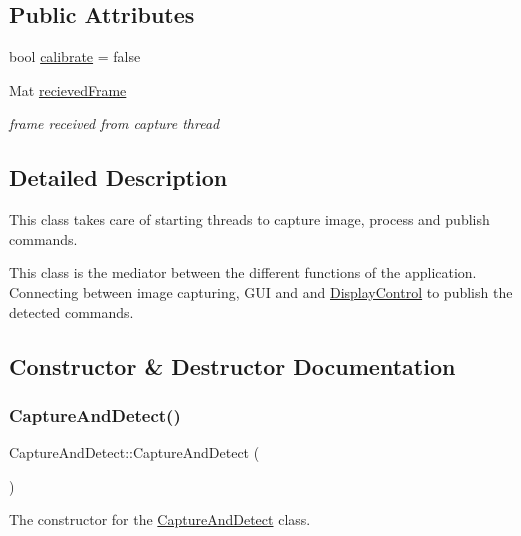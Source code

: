 \subsection*{Public Attributes}
\begin{DoxyCompactItemize}
\item 
bool \hyperlink{classGestro_1_1CaptureAndDetect_acbe1ce90cb6a7bad1c94a6be68cc4f0b}{calibrate} = false
\item 
Mat \hyperlink{classGestro_1_1CaptureAndDetect_a5bd3dee8a4b9bffe627b1475a84da4e8}{recieved\+Frame}
\begin{DoxyCompactList}\small\item\em frame received from capture thread \end{DoxyCompactList}\end{DoxyCompactItemize}


\subsection{Detailed Description}
This class takes care of starting threads to capture image, process and publish commands. 

This class is the mediator between the different functions of the application. Connecting between image capturing, G\+UI and and \hyperlink{classGestro_1_1DisplayControl}{Display\+Control} to publish the detected commands. 

\subsection{Constructor \& Destructor Documentation}
\mbox{\label{classGestro_1_1CaptureAndDetect_a26c41eaa5100975ec0f50c97592f4bf1}} 
\subsubsection{\texorpdfstring{Capture\+And\+Detect()}{CaptureAndDetect()}}
{\footnotesize\ttfamily Capture\+And\+Detect\+::\+Capture\+And\+Detect (\begin{DoxyParamCaption}{ }\end{DoxyParamCaption})}

The constructor for the \hyperlink{classGestro_1_1CaptureAndDetect}{Capture\+And\+Detect} class. 

